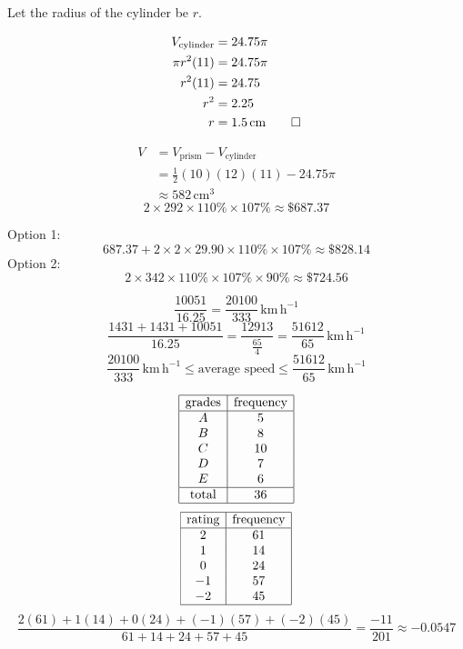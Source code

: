 \documentclass[]{article}
\begin{document}
Let the radius of the cylinder be \(r\).

\[\begin{aligned}
    V_{\text{cylinder}}&=24.75\pi\\
    \pi r^2(11)&=24.75\pi\\
    r^2(11)&=24.75\\
    r^2&=2.25\\
    r&=1.5\,\text{cm}\qed
\end{aligned}\]

\[\begin{aligned}
    V&=V_\text{prism}-V_\text{cylinder}\\
    &=\frac12(10)(12)(11)-24.75\pi\\
    &\approx582\,\text{cm}^3
\end{aligned}\]
\[2\times292\times110\%\times107\%\approx\$687.37\]

Option 1:
\[687.37+2\times2\times29.90\times110\%\times107\%\approx\$828.14\]
Option 2:
\[2\times342\times110\%\times107\%\times90\%\approx\$724.56\]

\[\frac{10051}{16.25}=\frac{20100}{333}\,\text{km}\,\text{h}^{-1}\]
\[\frac{1431+1431+10051}{16.25}=\frac{12913}{\frac{65}{4}}=\frac{51612}{65}\,\text{km}\,\text{h}^{-1}\]
\[\frac{20100}{333}\,\text{km}\,\text{h}^{-1}\leqslant\text{average speed}\leqslant\frac{51612}{65}\,\text{km}\,\text{h}^{-1}\]
\newpage

\[\begin{array}{|c|c|}
    \hline
    \text{grades}&\text{frequency}\\
    \hline
    A&5\\
    B&8\\
    C&10\\
    D&7\\
    E&6\\
    \hline
    \text{total}&36\\
    \hline
\end{array}\]
\[\begin{array}{|c|c|}
    \hline
    \text{rating}&\text{frequency}\\
    \hline
    2&61\\
    1&14\\
    0&24\\
    -1&57\\
    -2&45\\
    \hline
\end{array}\]
\[\frac{2(61)+1(14)+0(24)+(-1)(57)+(-2)(45)}{61+14+24+57+45}=\frac{-11}{201}\approx-0.0547\]
\end{document}
